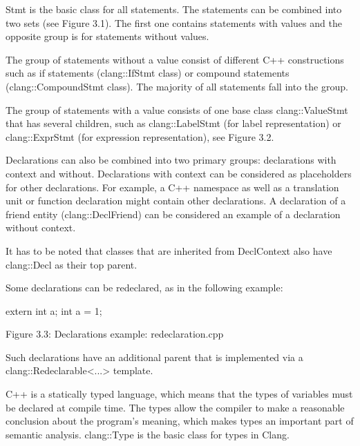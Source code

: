
Stmt is the basic class for all statements. The statements can be combined into two sets (see Figure 3.1). The first one contains statements with values and the opposite group is for statements without values.


The group of statements without a value consist of different C++ constructions such as if statements (clang::IfStmt class) or compound statements (clang::CompoundStmt class). The majority of all statements fall into the group.

The group of statements with a value consists of one base class clang::ValueStmt that has several children, such as clang::LabelStmt (for label representation) or clang::ExprStmt (for expression representation), see Figure 3.2.



Declarations can also be combined into two primary groups: declarations with context and without. Declarations with context can be considered as placeholders for other declarations. For example, a C++ namespace as well as a translation unit or function declaration might contain other declarations. A declaration of a friend entity (clang::DeclFriend) can be considered an example of a declaration without context.

It has to be noted that classes that are inherited from DeclContext also have clang::Decl as their top parent.

Some declarations can be redeclared, as in the following example:

\begin{cpp}
extern int a;
int a = 1;
\end{cpp}

\begin{center}
Figure 3.3: Declarations example: redeclaration.cpp
\end{center}

Such declarations have an additional parent that is implemented via a clang::Redeclarable<...> template.


C++ is a statically typed language, which means that the types of variables must be declared at compile time. The types allow the compiler to make a reasonable conclusion about the program's meaning, which makes types an important part of semantic analysis. clang::Type is the basic class for types in Clang.

